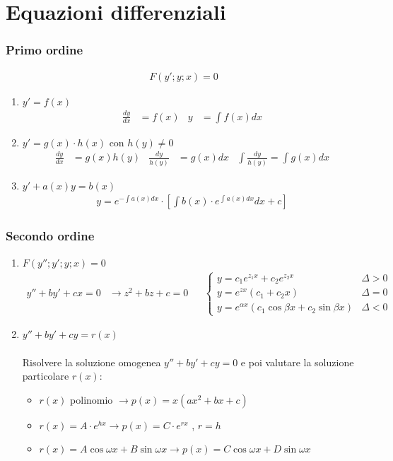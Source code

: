 \documentclass[a4paper]{article}
\begin{document}
	\newpage
	\section{Equazioni differenziali}
	\subsubsection*{Primo ordine}
	\begin{align*}
		F(y';y;x)=0
	\end{align*}
	\begin{enumerate}
		\item $y' = f(x)$
		\begin{align*}
			\frac{dy}{dx}&=f(x)		&		y &= \int f(x)dx
		\end{align*}
		\item $y'=g(x)\cdot h(x)$ con $h(y) \ne 0$
		\begin{align*}
			\frac{dy}{dx} &= g(x)h(y)	&	\frac{dy}{h(y)} &= g(x)dx	&	\int \frac{dy}{h(y)}=\int g(x)dx
		\end{align*}
		\item $y'+a(x)y = b(x)$
		\begin{align*}
			y = e^{-\int a(x)dx}\cdot \left[ \int b(x)\cdot e^{\int a(x)dx} dx + c \right]
		\end{align*}
	\end{enumerate}
	\subsubsection*{Secondo ordine}
	\begin{enumerate}
		\item $F(y'';y';y;x)=0$
		\begin{align*}
			y'' + by' + cx = 0 &\to z^2+bz+c=0		&		&\begin{cases}
			y = c_1e^{z_1x}+c_2e^{z_2x}		&	\varDelta > 0\\
			y = e^{zx}(c_1+c_2x)	&	\varDelta =0\\
			y = e^{\alpha x}(c_1\cos{\beta x} + c_2\sin{\beta x})	&	\varDelta<0
			\end{cases}
		\end{align*}
		\item $y'' +by' + cy = r(x)$\\\\
		Risolvere la soluzione omogenea $y'' +by' + cy = 0$ e poi valutare la soluzione particolare $r(x)$:
		\begin{itemize}
			\item  $r(x)$ polinomio $\to p(x) = x(ax^2+bx+c) $ \\
			\item  $r(x) = A \cdot e^{hx} \to p(x) = C \cdot e^{rx}$ , $r=h$\\
			\item  $r(x) = A \cos{\omega x} + B\sin{\omega x} \to p(x) = C\cos{\omega x} + D\sin{\omega x}$
		\end{itemize}
	\end{enumerate}
	
\end{document}
